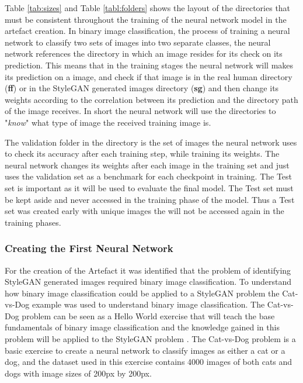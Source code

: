 Table \ref{tab:sizes} and Table \ref{tabl:folders} shows the layout of the directories that must be consistent throughout the training of the neural network model in the artefact creation. In binary image classification, the process of training a neural network to classify two sets of images into two separate classes, the neural network references the directory in which an image resides for its check on its prediction. This means that in the training stages the neural network will makes its prediction on a image, and check if that image is in the real human directory (\textbf{ff}) or in the StyleGAN generated images directory (\textbf{sg}) and then change its weights according to the correlation between its prediction and the directory path of the image receives. In short the neural network will use the directories to "\textit{know}" what type of image the received training image is. 

The validation folder in the directory is the set of images the neural network uses to check its accuracy after each training step, while training its weights. The neural network changes its weights after each image in the training set and just uses the validation set as a benchmark for each checkpoint in training. The Test set is important as it will be used to evaluate the final model. The Test set must be kept aside and never accessed in the training phase of the model. Thus a Test set was created early with unique images the will not be accessed again in the training phases.

\subsubsection{Creating the First Neural Network}

For the creation of the Artefact it was identified that the problem of identifying StyleGAN generated images required binary image classification. To understand how binary image classification could be applied to a StyleGAN problem the Cat-vs-Dog example was used to understand binary image classification. The Cat-vs-Dog problem can be seen as a Hello World exercise that will teach the base fundamentals of binary image classification and the knowledge gained in this problem will be applied to the StyleGAN problem \citep{cat2014}. The Cat-vs-Dog problem is a basic exercise to create a neural network to classify images as either a cat or a dog, and the dataset used in this exercise contains 4000 images of both cats and dogs with image sizes of 200px by 200px. 

